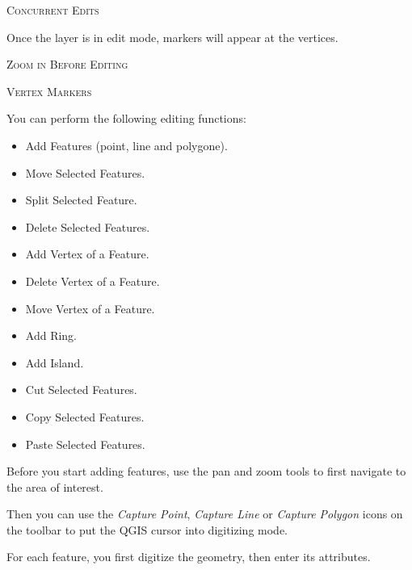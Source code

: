 \begin{Tip}[h]\caption{\textsc{Concurrent Edits}}
\end{Tip}

Once the layer is in edit mode, markers will appear at the
vertices.

\begin{Tip}[h]\caption{\textsc{Zoom in Before Editing}}
\end{Tip}

\begin{Tip}[h]\caption{\textsc{Vertex Markers}}
\end{Tip}

You can perform the following editing functions:

\begin{itemize}
\item Add Features (point, line and polygone).
\item Move Selected Features.
\item Split Selected Feature.
\item Delete Selected Features.
\item Add Vertex of a Feature.
\item Delete Vertex of a Feature.
\item Move Vertex of a Feature.
\item Add Ring.
\item Add Island.
\item Cut Selected Features.
\item Copy Selected Features.
\item Paste Selected Features.
\end{itemize}


Before you start adding features, use the pan
and zoom tools to first navigate to the area of interest.

Then you can use the \textit{Capture Point}, \textit{Capture Line} 
or \textit{Capture Polygon} icons on the toolbar to put the QGIS cursor
into digitizing mode.

For each feature, you first digitize the geometry, then enter its attributes.

